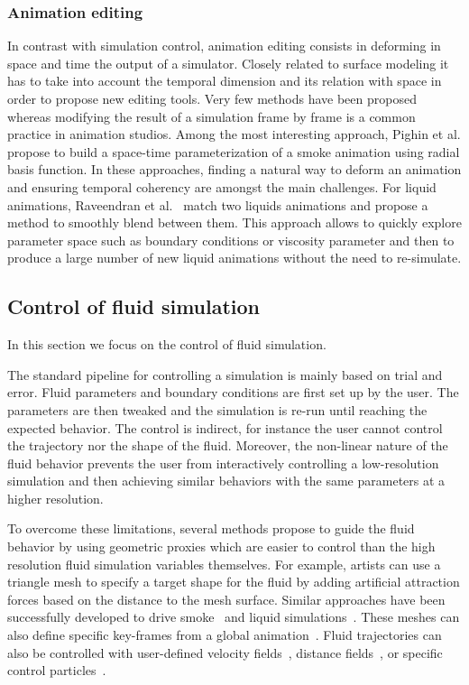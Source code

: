 \subsubsection{Animation editing} 
In contrast with simulation control, animation editing consists in deforming in space and time the output of a simulator. Closely related to surface modeling it has to take into account the temporal dimension and its relation with space in order to propose new editing tools. Very few methods have been proposed whereas modifying the result of a simulation frame by frame is a common practice in animation studios. Among the most interesting approach, Pighin et al.\cite{Pighin2004} propose to build a space-time parameterization of a smoke animation using radial basis function. In these approaches, finding a natural way to deform an animation and ensuring temporal coherency are amongst the main challenges. For liquid animations, Raveendran et al.~\cite{Raveendran2014} match two liquids animations and propose a method to smoothly blend between them. This approach allows to quickly explore parameter space such as boundary conditions or viscosity parameter and then to produce a large number of new liquid animations without the need to re-simulate.

\subsection{Control of fluid simulation}
\label{subsec:fluidControl}
In this section we focus on the control of fluid simulation.

The standard pipeline for controlling a simulation is mainly based on trial and error. Fluid parameters and boundary conditions are first set up by the user. The parameters are then tweaked and the simulation is re-run until reaching the expected behavior. The control is indirect, for instance the user cannot control the trajectory nor the shape of the fluid. Moreover, the non-linear nature of the fluid behavior prevents the user from interactively controlling a low-resolution simulation and then achieving similar behaviors with the same parameters at a higher resolution.

To overcome these limitations, several methods propose to guide the fluid behavior by using geometric proxies which are easier to control than the high resolution fluid simulation variables themselves.
For example, artists can use a triangle mesh to specify a target shape for the fluid by adding artificial attraction forces based on the distance to the mesh surface. Similar approaches have been successfully developed to drive smoke~\cite{Fattal2004,Hong2004,Shi2005a} and liquid simulations~\cite{Shi2005b,Raveendran2012}. These meshes can also define specific key-frames from a global animation~\cite{Treuille2003,McNamara2004}.
Fluid trajectories can also be controlled with user-defined velocity fields~\cite{Kim2006:SmokeControl}, distance fields~\cite{Yang2013}, or specific control particles~\cite{Thurey2006:FluidControl,Madill2013}. 

